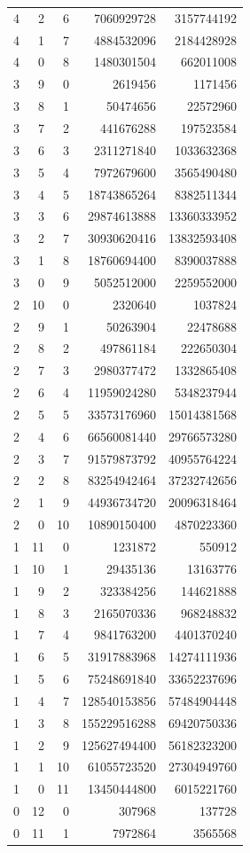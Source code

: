 \begin{longtable}{rrr|rr}
4&2&6&7060929728&3157744192\\
4&1&7&4884532096&2184428928\\
4&0&8&1480301504&662011008\\
3&9&0&2619456&1171456\\
3&8&1&50474656&22572960\\
3&7&2&441676288&197523584\\
3&6&3&2311271840&1033632368\\
3&5&4&7972679600&3565490480\\
3&4&5&18743865264&8382511344\\
3&3&6&29874613888&13360333952\\
3&2&7&30930620416&13832593408\\
3&1&8&18760694400&8390037888\\
3&0&9&5052512000&2259552000\\
2&10&0&2320640&1037824\\
2&9&1&50263904&22478688\\
2&8&2&497861184&222650304\\
2&7&3&2980377472&1332865408\\
2&6&4&11959024280&5348237944\\
2&5&5&33573176960&15014381568\\
2&4&6&66560081440&29766573280\\
2&3&7&91579873792&40955764224\\
2&2&8&83254942464&37232742656\\
2&1&9&44936734720&20096318464\\
2&0&10&10890150400&4870223360\\
1&11&0&1231872&550912\\
1&10&1&29435136&13163776\\
1&9&2&323384256&144621888\\
1&8&3&2165070336&968248832\\
1&7&4&9841763200&4401370240\\
1&6&5&31917883968&14274111936\\
1&5&6&75248691840&33652237696\\
1&4&7&128540153856&57484904448\\
1&3&8&155229516288&69420750336\\
1&2&9&125627494400&56182323200\\
1&1&10&61055723520&27304949760\\
1&0&11&13450444800&6015221760\\
0&12&0&307968&137728\\
0&11&1&7972864&3565568\\

\end{longtable}
